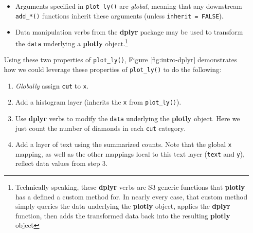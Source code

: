 \documentclass[
  12pt,
]{krantz}
\newenvironment{Shaded}{\begin{snugshade}}{\end{snugshade}}
\newcommand{\DataTypeTok}[1]{\textcolor[rgb]{0.13,0.29,0.53}{#1}}
\newcommand{\KeywordTok}[1]{\textcolor[rgb]{0.13,0.29,0.53}{\textbf{#1}}}
\newcommand{\NormalTok}[1]{#1}
\newcommand{\OperatorTok}[1]{\textcolor[rgb]{0.81,0.36,0.00}{\textbf{#1}}}
\newcommand{\OtherTok}[1]{\textcolor[rgb]{0.56,0.35,0.01}{#1}}
\newcommand{\StringTok}[1]{\textcolor[rgb]{0.31,0.60,0.02}{#1}}
\providecommand{\tightlist}{%
  \setlength{\itemsep}{0pt}\setlength{\parskip}{0pt}}
\begin{document}
\begin{itemize}
\tightlist
\item
  Arguments specified in \texttt{plot\_ly()} are \emph{global}, meaning that any downstream \texttt{add\_*()} functions inherit these arguments (unless \texttt{inherit\ =\ FALSE}).
\item
  Data manipulation verbs from the \textbf{dplyr} package may be used to transform the \texttt{data} underlying a \textbf{plotly} object.\footnote{Technically speaking, these \textbf{dplyr} verbs are S3 generic functions that \textbf{plotly} has a defined a custom method for. In nearly every case, that custom method simply queries the data underlying the \textbf{plotly} object, applies the \textbf{dplyr} function, then adds the transformed data back into the resulting \textbf{plotly} object}
\end{itemize}

Using these two properties of \texttt{plot\_ly()}, Figure \ref{fig:intro-dplyr} demonstrates how we could leverage these properties of \texttt{plot\_ly()} to do the following:

\begin{enumerate}
\def\labelenumi{\arabic{enumi}.}
\tightlist
\item
  \emph{Globally} assign \texttt{cut} to \texttt{x}.
\item
  Add a histogram layer (inherits the \texttt{x} from \texttt{plot\_ly()}).
\item
  Use \textbf{dplyr} verbs to modify the \texttt{data} underlying the \textbf{plotly} object. Here we just count the number of diamonds in each \texttt{cut} category.
\item
  Add a layer of text using the summarized counts. Note that the global \texttt{x} mapping, as well as the other mappings local to this text layer (\texttt{text} and \texttt{y}), reflect data values from step 3.
\end{enumerate}

\begin{Shaded}
\end{Shaded}
\end{document}
